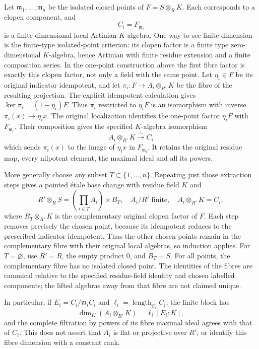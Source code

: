 Let \(\mathfrak m_1,\ldots,\mathfrak m_n\) be the isolated closed points of \(F=S\otimes_R K\). Each corresponds to a clopen component, and \[
C_i=F_{\mathfrak m_i}
\] is a finite-dimensional local Artinian \(K\)-algebra. One way to see finite dimension is the finite-type isolated-point criterion: its clopen factor is a finite type zero-dimensional \(K\)-algebra, hence Artinian with finite residue extension and a finite composition series. In the one-point construction above the first fibre factor is exactly this clopen factor, not only a field with the same point. Let \(\eta_i\in F\) be its original indicator idempotent, and let \(\pi_i:F\to A_i\otimes_{R'}K\) be the fibre of the resulting projection. The explicit idempotent calculation gives \(\ker\pi_i=(1-\eta_i)F\). Thus \(\pi_i\) restricted to \(\eta_iF\) is an isomorphism with inverse \(\pi_i(x)\mapsto\eta_i x\). The original localization identifies the one-point factor \(\eta_iF\) with \(F_{\mathfrak m_i}\). Their composition gives the specified \(K\)-algebra isomorphism \[
A_i\otimes_{R'}K\xrightarrow{\;\sim\;}C_i
\] which sends \(\pi_i(x)\) to the image of \(\eta_i x\) in \(F_{\mathfrak m_i}\). It retains the original residue map, every nilpotent element, the maximal ideal and all its powers.

More generally choose any subset \(T\subset\{1,\ldots,n\}\). Repeating just those extraction steps gives a pointed étale base change with residue field \(K\) and \[
R'\otimes_R S=
\left(\prod_{i\in T}A_i\right)\times B_T,
\quad A_i/R'\text{ finite},\quad A_i\otimes_{R'}K=C_i,
\] where \(B_T\otimes_{R'}K\) is the complementary original clopen factor of \(F\). Each step removes precisely the chosen point, because its idempotent reduces to the prescribed indicator idempotent. Thus the other chosen points remain in the complementary fibre with their original local algebras, so induction applies. For \(T=\varnothing\), use \(R'=R\), the empty product \(0\), and \(B_T=S\). For all points, the complementary fibre has no isolated closed point. The identities of the fibres are canonical relative to the specified residue-field identity and chosen labelled components; the lifted algebras away from that fibre are not claimed unique.

In particular, if \(E_i=C_i/\mathfrak m_iC_i\) and \(\ell_i=\operatorname{length}_{C_i}C_i\), the finite block has \[
\dim_K(A_i\otimes_{R'}K)=\ell_i[E_i:K],
\] and the complete filtration by powers of its fibre maximal ideal agrees with that of \(C_i\). This does not assert that \(A_i\) is flat or projective over \(R'\), or identify this fibre dimension with a constant rank.

